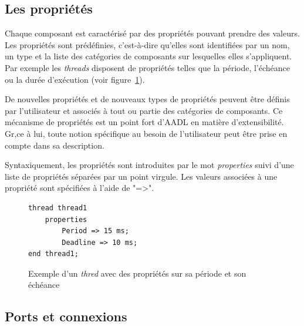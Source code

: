 \documentclass[11pt,a4paper]{paper}
\begin{document}
\begin{appendices}
\subsection{Les propriétés}

Chaque composant est caractérisé par des propriétés pouvant prendre des valeurs. Les propriétés sont prédéfinies, c'est-à-dire qu'elles sont identifiées par un nom, un type et la liste des catégories de composants sur lesquelles elles s'appliquent. Par exemple les {\em threads} disposent de propriétés telles que la période, l'échéance ou la durée d'exécution (voir figure~\ref{fig:ex_prop}).

De nouvelles propriétés et de nouveaux types de propriétés peuvent être définis par l'utilisateur et associés à tout ou partie des catégories de composants. Ce mécanisme de propriétés est un point fort d'AADL en matière d'extensibilité. Gr‚ce à lui, toute notion spécifique au besoin de l'utilisateur peut être prise en compte dans sa description.

Syntaxiquement, les propriétés sont introduites par le mot {\em properties} suivi d'une liste de propriétés séparées par un point virgule. Les valeurs associées à une propriété sont spécifiées à l'aide de "=>".

\begin{figure}[htbp]
\begin{center}
\begin{minipage}[c]{.46\linewidth}
\begin{lstlisting}
thread thread1
    properties
        Period => 15 ms;
        Deadline => 10 ms;
end thread1;
\end{lstlisting}
\end{minipage}
\caption{Exemple d'un {\em thred} avec des propriétés sur sa période et son échéance}
\label{fig:ex_prop}
\end{center}
\end{figure}

\subsection{Ports et connexions}


\end{appendices}
\end{document}
